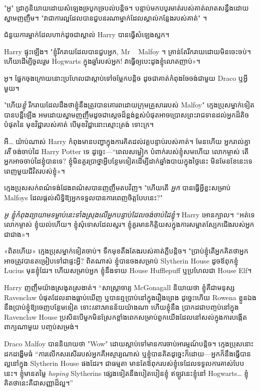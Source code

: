 "អូ" ដ្រាកូនិយាយដោយសំឡេងច្របូកច្របល់បន្តិច។ បន្ទាប់មកបបូរមាត់របស់គាត់លាតសន្ធឹងដោយស្នាមញញឹម។ "វាជាការល្អដែលបានជួបនរណាម្នាក់ដែលស្គាល់កន្លែងរបស់គាត់" ។

ជំនួយការម្នាក់ដែលហាក់ដូចជាស្គាល់ Harry បានធ្វើសំឡេងស្អក។

Harry ផ្ទុះឡើង។ "ខ្ញុំរីករាយដែលបានជួបអ្នក, Mr ~ Malfoy ។ គ្រាន់​តែ​រីក​រាយ​ដោយ​មិន​ចេះ​ចប់។ ហើយដើម្បីចូលរួម Hogwarts ក្នុងឆ្នាំរបស់អ្នក! វា​ធ្វើ​ឲ្យ​បេះដូង​ខ្ញុំ​លោត​ញាប់»។

អូ។ ផ្នែកចុងក្រោយនោះប្រហែលជាស្តាប់ទៅចម្លែកបន្តិច ដូចជាគាត់កំពុងចែចង់ជាមួយ Draco ឬអ្វីមួយ។

"ហើយ\emph{ខ្ញុំ} រីករាយដែលដឹងថាខ្ញុំនឹងត្រូវបានគោរពដោយក្រុមគ្រួសាររបស់ Malfoy" ក្មេងប្រុសម្នាក់ទៀតបានបន្លឺឡើង អមដោយស្នាមញញឹមដូចជាស្តេចដ៏ខ្ពង់ខ្ពស់បំផុតអាចប្រោសព្រះរាជទានដល់អ្នកដ៏តិចបំផុតនៃ មុខវិជ្ជារបស់គាត់ បើមុខវិជ្ជានោះស្មោះត្រង់ ទោះក្រ។

អឺ… យ៉ាប់ណាស់ Harry កំពុងមានបញ្ហាក្នុងការគិតដល់វគ្គបន្ទាប់របស់គាត់។ មែនហើយ អ្នករាល់គ្នា \emph{តើ} ចង់ចាប់ដៃ Harry Potter ទេ ដូច្នេះ—“ពេលសម្លៀក បំពាក់របស់ខ្ញុំសមហើយ លោកម្ចាស់ តើអ្នកអាចចាប់ដៃខ្ញុំបានទេ? ខ្ញុំ​មិន​គួរ​ប្រាថ្នា​អ្វី​បន្ថែម​ទៀត​ដើម្បី​ដាក់​ឆ្នាំង​បាយ​ក្នុង​ថ្ងៃ​នេះ មិន​មែន​ខែ​នេះ​ទេ ពេញ​មួយ​ជីវិត​របស់​ខ្ញុំ»។

ក្មេង​ប្រុស​សក់​ពណ៌ទង់ដែង​ពណ៌​ស​បាន​ញញឹម​តប​វិញ។ "ហើយតើ \emph{អ្នក} បានធ្វើអ្វីខ្លះសម្រាប់ Malfoys ដែលផ្តល់សិទ្ធិឱ្យអ្នកទទួលបានការពេញចិត្តបែបនេះ?"

\emph{អូ ខ្ញុំកំពុងព្យាយាមទម្លាប់នេះទាំងស្រុងលើអ្នកបន្ទាប់ដែលចង់ចាប់ដៃខ្ញុំ។} Harry អោនក្បាល។ “អត់ទេ លោកម្ចាស់ ខ្ញុំយល់ហើយ។ ខ្ញុំសុំទោសដែលសួរ។ ខ្ញុំ​គួរ​មាន​កិត្តិយស​ក្នុង​ការ​សម្អាត​ស្បែក​ជើង​របស់​អ្នក​ជា​ជាង»។

«ពិតហើយ» ក្មេងប្រុសម្នាក់ទៀតចាប់។ ទឹក​មុខ​តឹងតែង​របស់​គាត់​ភ្លឺ​បន្តិច។ "ប្រាប់ខ្ញុំតើអ្នកគិតថាអ្នកអាចត្រូវបានតម្រៀបទៅជាផ្ទះអ្វី? ពិតណាស់ ខ្ញុំបានចងសម្រាប់ Slytherin House ដូចឪពុកខ្ញុំ Lucius មុនខ្ញុំដែរ។ ហើយសម្រាប់អ្នក ខ្ញុំនឹងទាយ House Hufflepuff ឬប្រហែលជា House Elf។

Harry ញញឹមយ៉ាងស្រងូតស្រងាត់។ “សាស្រ្តាចារ្យ McGonagall និយាយថា ខ្ញុំគឺជាមនុស្ស Ravenclaw បំផុតដែលនាងធ្លាប់ឃើញ ឬបានឮប្រាប់នៅក្នុងរឿងព្រេង ដូច្នេះហើយ Rowena ខ្លួនឯងនឹងប្រាប់ខ្ញុំឱ្យចេញបន្ថែមទៀត ទោះ\emph{នោះ}មានន័យយ៉ាងណា ហើយខ្ញុំនឹង ប្រាកដជាបញ្ចប់នៅក្នុង Ravenclaw House ប្រសិនបើមួកមិនស្រែកខ្លាំងពេកសម្រាប់ពួកយើងដែលនៅសល់ក្នុងការបង្កើតពាក្យណាមួយ បញ្ចប់សម្រង់។

Draco Malfoy បាននិយាយថា "Wow" ដោយស្តាប់ទៅមានការចាប់អារម្មណ៍បន្តិច។ ក្មេងប្រុសនោះដកដង្ហើមធំ “ការលើកសរសើររបស់អ្នកគឺអស្ចារ្យណាស់ ឬខ្ញុំបានគិតដូច្នេះក៏ដោយ—អ្នកក៏នឹងធ្វើបានល្អនៅក្នុង Slytherin House ផងដែរ។ ជាធម្មតា មានតែឪពុករបស់ខ្ញុំទេដែលទទួលការគាស់បែបនេះ។ ខ្ញុំមានតម្លៃ \emph{hoping} Slytherins ផ្សេងទៀតនឹងបៀតបៀនខ្ញុំ ឥឡូវនេះខ្ញុំនៅ Hogwarts… ខ្ញុំគិតថានេះគឺជាសញ្ញាដ៏ល្អ។”


